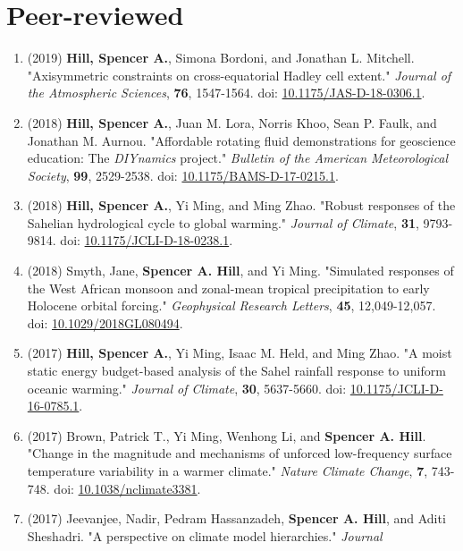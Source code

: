 \documentclass[12pt,letterpaper]{shillcv}
\begin{document}
\section*{Peer-reviewed}
\label{sec:org50c0033}
\begin{enumerate}
\item (2019) \textbf{Hill, Spencer A.}, Simona Bordoni, and Jonathan L. Mitchell.
"Axisymmetric constraints on cross-equatorial Hadley cell extent."
\emph{Journal of the Atmospheric Sciences}, \textbf{76}, 1547-1564.  doi: \href{https://doi.org/10.1175/JAS-D-18-0306.1}{10.1175/JAS-D-18-0306.1}.
\item (2018) \textbf{Hill, Spencer A.}, Juan M. Lora, Norris Khoo, Sean P. Faulk, and
Jonathan M.  Aurnou.  "Affordable rotating fluid demonstrations for
geoscience education: The \emph{DIYnamics} project."  \emph{Bulletin of the
American Meteorological Society}, \textbf{99}, 2529-2538.  doi:
\href{https://doi.org/10.1175/BAMS-D-17-0215.1}{10.1175/BAMS-D-17-0215.1}.
\item (2018) \textbf{Hill, Spencer A.}, Yi Ming, and Ming Zhao.  "Robust responses of the
Sahelian hydrological cycle to global warming."  \emph{Journal of
Climate}, \textbf{31}, 9793-9814.  doi: \href{https://doi.org/10.1175/JCLI-D-18-0238.1}{10.1175/JCLI-D-18-0238.1}.
\item (2018) Smyth, Jane, \textbf{Spencer A. Hill}, and Yi Ming.  "Simulated responses of
the West African monsoon and zonal-mean tropical precipitation to early
Holocene orbital forcing."  \emph{Geophysical Research Letters}, \textbf{45},
12,049-12,057.  doi: \href{https://doi.org/10.1029/2018GL080494}{10.1029/2018GL080494}.
\item (2017) \textbf{Hill, Spencer A.}, Yi Ming, Isaac M. Held, and Ming Zhao.  "A moist
static energy budget-based analysis of the Sahel rainfall response to uniform
oceanic warming."  \emph{Journal of Climate}, \textbf{30}, 5637-5660.  doi:
\href{https://doi.org/10.1175/JCLI-D-16-0785.1}{10.1175/JCLI-D-16-0785.1}.
\item (2017) Brown, Patrick T., Yi Ming, Wenhong Li, and \textbf{Spencer A. Hill}.  "Change
in the magnitude and mechanisms of unforced low-frequency surface temperature
variability in a warmer climate."  \emph{Nature Climate Change}, \textbf{7}, 743-748.
doi: \href{https://doi.org/10.1038/nclimate3381}{10.1038/nclimate3381}.
\item (2017) Jeevanjee, Nadir, Pedram Hassanzadeh, \textbf{Spencer A. Hill}, and Aditi
Sheshadri.  "A perspective on climate model hierarchies."  \emph{Journal
}
\end{enumerate}
\end{document}
